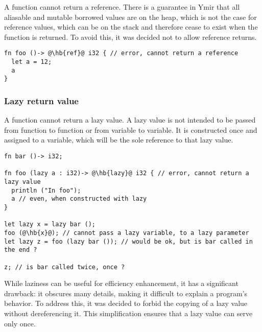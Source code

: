 A function cannot return a reference. There is a guarantee in Ymir that all
aliasable and mutable borrowed values are on the heap, which is not the case for
reference values, which can be on the stack and therefore cease to exist when
the function is returned. To avoid this, it was decided not to allow reference
returns.

\begin{lstlisting}[style=coloredverbatim, escapechar=@]
fn foo ()-> @\hb{ref}@ i32 { // error, cannot return a reference
  let a = 12;
  a
}
\end{lstlisting}

\subsubsection*{Lazy return value}
\label{sec:lazy_return}

A function cannot return a lazy value. A lazy value is not intended to be passed
from function to function or from variable to variable. It is constructed once
and assigned to a variable, which will be the sole reference to that lazy value.

\begin{lstlisting}[style=coloredverbatim, escapechar=@
]fn bar ()-> i32;

fn foo (lazy a : i32)-> @\hb{lazy}@ i32 { // error, cannot return a lazy value
  println ("In foo");
  a // even, when constructed with lazy
}

let lazy x = lazy bar ();
foo (@\hb{x}@); // cannot pass a lazy variable, to a lazy parameter
let lazy z = foo (lazy bar ()); // would be ok, but is bar called in the end ?

z; // is bar called twice, once ?
\end{lstlisting}

While laziness can be useful for efficiency enhancement, it has a significant
drawback: it obscures many details, making it difficult to explain a program's
behavior. To address this, it was decided to forbid the copying of a lazy value
without dereferencing it. This simplification ensures that a lazy value can
serve only once.
